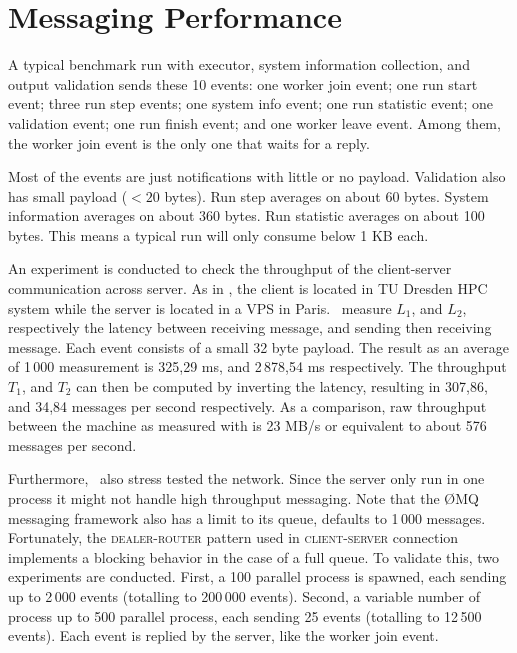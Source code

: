 \section{Messaging Performance}
\label{sec:eval.messaging}

A typical benchmark run with executor, system information collection, and output validation sends these 10 events:
one worker join event;
one run start event;
three run step events;
one system info event;
one run statistic event;
one validation event;
one run finish event;
and one worker leave event.
Among them, the worker join event is the only one that waits for a reply.

Most of the events are just notifications with little or no payload.
Validation also has small payload ($< 20$ bytes).
Run step averages on about 60 bytes.
System information averages on about 360 bytes.
Run statistic averages on about 100 bytes.
This means a typical run will only consume below 1 KB each.

An experiment is conducted to check the throughput of the client-server communication across server.
As in , the client is located in TU Dresden HPC system while the server is located in a VPS in Paris.
\First~measure \(L_1\), and \(L_2\), respectively the latency between receiving message, and sending then receiving message.
Each event consists of a small 32 byte payload.
The result as an average of 1\,000 measurement is 325,29 ms, and 2\,878,54 ms respectively.
The throughput \(T_1\), and \(T_2\) can then be computed by inverting the latency, resulting in 307,86, and 34,84 messages per second respectively.
As a comparison, raw throughput between the machine as measured with  is 23 MB/s or equivalent to about 576 messages per second.

Furthermore, \first~also stress tested the network.
Since the server only run in one process it might not handle high throughput messaging.
Note that the \O MQ messaging framework also has a limit to its queue, defaults to 1\,000 messages.
Fortunately, the \textsc{dealer-router} pattern used in \textsc{client-server} connection implements a blocking behavior in the case of a full queue.
To validate this, two experiments are conducted.
First, a 100 parallel process is spawned, each sending up to 2\,000 events (totalling to 200\,000 events).
Second, a variable number of process up to 500 parallel process, each sending 25 events (totalling to 12\,500 events).
Each event is replied by the server, like the worker join event.

